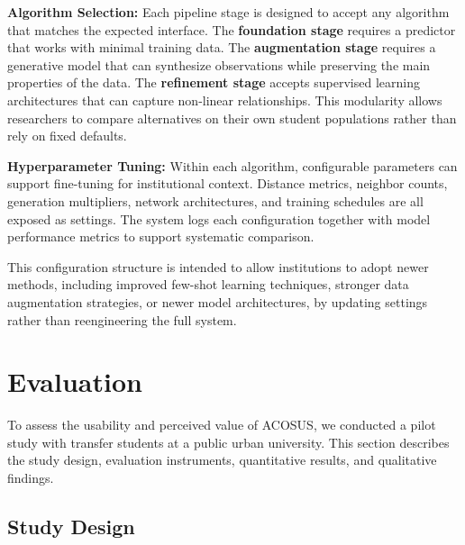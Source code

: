 \documentclass[letterpaper,11pt]{article}
\begin{document}
\textbf{Algorithm Selection:} Each pipeline stage is designed to accept any algorithm that matches the expected interface. The \textbf{foundation stage} requires a predictor that works with minimal training data. The \textbf{augmentation stage} requires a generative model that can synthesize observations while preserving the main properties of the data. The \textbf{refinement stage} accepts supervised learning architectures that can capture non-linear relationships. This modularity allows researchers to compare alternatives on their own student populations rather than rely on fixed defaults.

\textbf{Hyperparameter Tuning:} Within each algorithm, configurable parameters can support fine-tuning for institutional context. Distance metrics, neighbor counts, generation multipliers, network architectures, and training schedules are all exposed as settings. The system logs each configuration together with model performance metrics to support systematic comparison.

This configuration structure is intended to allow institutions to adopt newer methods, including improved few-shot learning techniques, stronger data augmentation strategies, or newer model architectures, by updating settings rather than reengineering the full system.

\section{Evaluation}\label{sec:evaluation}

To assess the usability and perceived value of ACOSUS, we conducted a pilot study with transfer students at a public urban university. This section describes the study design, evaluation instruments, quantitative results, and qualitative findings.

\subsection{Study Design}\label{subsec:studydesign}

\end{document}
